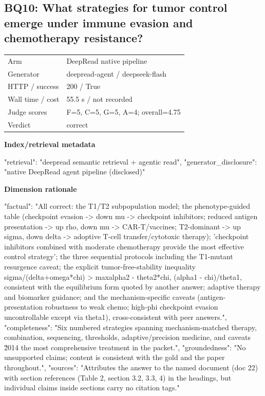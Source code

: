 \documentclass[10pt]{article}
\begin{document}
\subsection{BQ10: What strategies for tumor control emerge under immune evasion and chemotherapy resistance?}
\begin{tabular}{@{}ll@{}}
Arm & DeepRead native pipeline\\
Generator & deepread-agent / deepseek-flash\\
HTTP / success & 200 / True\\
Wall time / cost & 55.5 s / not recorded\\
Judge scores & F=5, C=5, G=5, A=4; overall=4.75\\
Verdict & correct\\
\end{tabular}

\textbf{Index/retrieval metadata}
\begin{EvidenceText}
{
  "retrieval": "deepread semantic retrieval + agentic read",
  "generator_disclosure": "native DeepRead agent pipeline (disclosed)"
}
\end{EvidenceText}

\textbf{Dimension rationale}
\begin{EvidenceText}
{
  "factual": "All correct: the T1/T2 subpopulation model; the phenotype-guided table (checkpoint evasion -> down mu -> checkpoint inhibitors; reduced antigen presentation -> up rho, down mu -> CAR-T/vaccines; T2-dominant -> up sigma, down delta -> adoptive T-cell transfer/cytotoxic therapy); 'checkpoint inhibitors combined with moderate chemotherapy provide the most effective control strategy'; the three sequential protocols including the T1-mutant resurgence caveat; the explicit tumor-free-stability inequality sigma/(delta+omega*chi) > max{alpha2 - theta2*chi, (alpha1 - chi)/theta1}, consistent with the equilibrium form quoted by another answer; adaptive therapy and biomarker guidance; and the mechanism-specific caveats (antigen-presentation robustness to weak chemo; high-phi checkpoint evasion uncontrollable except via theta1), cross-consistent with peer answers.",
  "completeness": "Six numbered strategies spanning mechanism-matched therapy, combination, sequencing, thresholds, adaptive/precision medicine, and caveats \u2014 the most comprehensive treatment in the packet.",
  "groundedness": "No unsupported claims; content is consistent with the gold and the paper throughout.",
  "sources": "Attributes the answer to the named document (doc 22) with section references (Table 2, section 3.2, 3.3, 4) in the headings, but individual claims inside sections carry no citation tags."
}
\end{EvidenceText}
\end{document}
